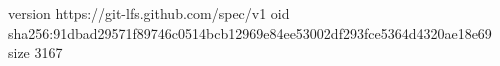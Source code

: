 version https://git-lfs.github.com/spec/v1
oid sha256:91dbad29571f89746c0514bcb12969e84ee53002df293fce5364d4320ae18e69
size 3167
